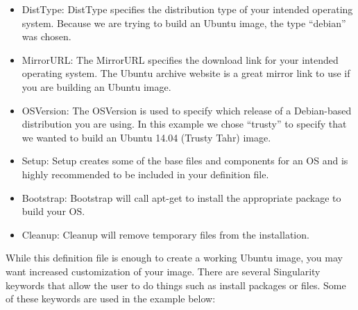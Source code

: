\documentclass[letterpaper,10pt,english]{sphinxmanual}
\begin{document}
%
\begin{sphinxVerbatim}[commandchars=\\\{\}]
 

 

 








        
\end{sphinxVerbatim}
\begin{itemize}
\item {} 
DistType: DistType specifies the distribution type of your intended operating system. Because we are trying to build an Ubuntu image, the type “debian” was chosen.

\item {} 
MirrorURL: The MirrorURL specifies the download link for your intended operating system. The Ubuntu archive website is a great mirror link to use if you are building an Ubuntu image.

\item {} 
OSVersion: The OSVersion is used to specify which release of a Debian-based distribution you are using. In this example we chose “trusty” to specify that we wanted to build an Ubuntu
14.04 (Trusty Tahr) image.

\item {} 
Setup: Setup creates some of the base files and components for an OS and is highly recommended to be included in your definition file.

\item {} 
Bootstrap: Bootstrap will call apt-get to install the appropriate package to build your OS.

\item {} 
Cleanup: Cleanup will remove temporary files from the installation.

\end{itemize}

While this definition file is enough to create a working Ubuntu image, you may want increased customization of your image. There are several Singularity keywords that allow the user to do
things such as install packages or files. Some of these keywords are used in the example below:
\end{document}
